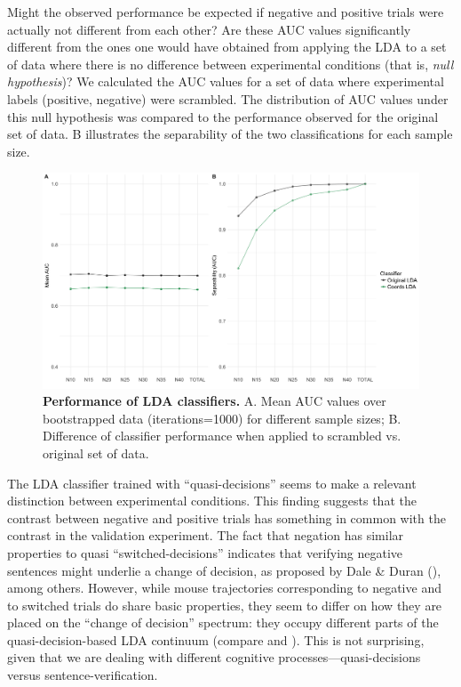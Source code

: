 \documentclass{article}
\begin{document}
Might the observed performance be expected if negative and positive trials were actually not different from each other? Are these AUC values significantly different from the ones one would have obtained from applying the LDA to a set of data where there is no difference between experimental conditions (that is, \emph{null hypothesis})? We calculated the AUC values for a set of data where experimental labels (positive, negative) were scrambled. The distribution of AUC values under this  null hypothesis was compared to the performance observed for the original set of data. B illustrates the separability of the two classifications for each sample size.

\begin{figure}
\centering
\includegraphics[width=\textwidth]{auc_permutation_negation_1.png}
\caption{\textbf{Performance of LDA classifiers.} A. Mean AUC values over bootstrapped data (iterations=1000) for different sample sizes;  B. Difference of classifier performance when applied to scrambled vs. original set of data.}
\label{fig:permutation_AUC_negation}
\end{figure}

The LDA classifier trained with ``quasi-decisions'' seems to make a relevant distinction between experimental conditions. This finding suggests that the contrast between negative and positive trials has something in common with the contrast in the validation experiment. The fact that negation has similar properties to quasi ``switched-decisions'' indicates that verifying negative sentences might underlie a change of decision, as proposed by Dale \& Duran (\citeyear{Dale2011}), among others.  
However, while mouse trajectories corresponding to negative and to switched trials do share basic properties, they seem to differ on how they are placed on the ``change of decision'' spectrum: they occupy different parts of the quasi-decision-based LDA continuum (compare  and ). This is not surprising, given that we are dealing with different cognitive processes---quasi-decisions versus sentence-verification.
\end{document}

